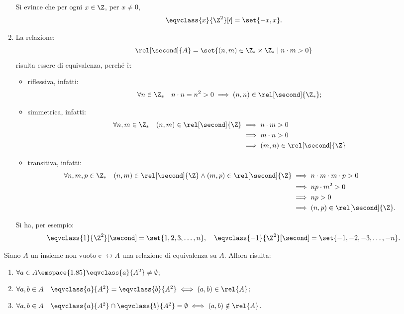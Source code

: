 \begin{examples}
\begin{enumerate}
\[            \]
            Si evince che per ogni \(x \in \Z\), per \(x \neq 0\), 
            \[
               \eqvclass{x}{\Z^2}[\prime] = \set{-x, x}.
            \]
%
        \item La relazione:
            \[
                \rel[\second]{A} = \set{(n, m) \in \Z_* \times \Z_* \mid n \cdot m > 0}
            \]
            risulta essere di equivalenza, perché è:
            \begin{itemize}
                \item riflessiva, infatti:
                    \[
                        \forall n \in \Z_* \quad n \cdot n = n^2 > 0 \implies (n, n) \in \rel[\second]{\Z_*};
                    \]
                \item simmetrica, infatti:
                    \begin{alignat*}{1}
                        \forall n,m \in \Z_* \quad (n, m) \in \rel[\second]{\Z}
                            &\implies n \cdot m > 0 \\
                            &\implies m \cdot n > 0 \\
                            &\implies (m, n) \in \rel[\second]{\Z}
                    \end{alignat*}
                \item transitiva, infatti:
                    \begin{alignat*}{1}
                        \forall n,m,p \in \Z_* \quad (n, m) \in \rel[\second]{\Z} \land (m, p) \in \rel[\second]{\Z}
                            &\implies n \cdot m \cdot m \cdot p > 0 \\
                            &\implies np \cdot m^2 > 0 \\
                            &\implies np > 0 \\
                            &\implies (n, p) \in \rel[\second]{\Z}.
                    \end{alignat*}
            \end{itemize}
        Si ha, per esempio:
        \[  
           \eqvclass{1}{\Z^2}[\second] = \set{1, 2, 3, \dotsc, n}, \quad
           \eqvclass{-1}{\Z^2}[\second] = \set{-1, -2, -3, \dotsc, -n}.
        \]
    \end{enumerate}
\end{examples}


\begin{proposition}\label{prop:proprietà_classi_di_equivalenza}
    Siano \(A\) un insieme non vuoto e \(\rel{A}\) una relazione di equivalenza su \(A\). Allora risulta:
    \begin{enumerate}
        \item \(\forall a \in A \emspace{1.85} \eqvclass{a}{A^2} \neq \emptyset\);
        \item \(\forall a,b \in A \quad \eqvclass{a}{A^2} = \eqvclass{b}{A^2} \iff (a, b) \in \rel{A}\);
        \item \(\forall a,b \in A \quad \eqvclass{a}{A^2} \cap \eqvclass{b}{A^2} = \emptyset \iff (a, b) \notin \rel{A}\).
    \end{enumerate}
\end{proposition}


